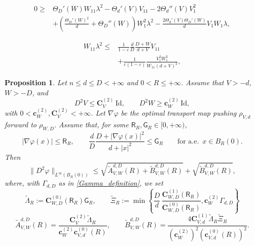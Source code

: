 \documentclass[10pt,a4paper]{amsart}
\newtheorem{proposition}{Proposition}
\newcommand{\CV}{\mathbf{C}_V}
\newcommand{\CVp}[1]{\mathbf{C}_{V,#1}}
\newcommand{\CWp}[1]{\mathbf{C}_{W,#1}}
\newcommand{\ThetaPar}{\Theta}
\newcommand{\cVp}[1]{\mathbf{c}_{V,#1}}
\newcommand{\cW}{\mathbf{c}_W}
\renewcommand{\epsilon}{\varepsilon}
\begin{document}
\begin{equation}\label{Exact_second_variation}
\begin{aligned}
0 \ge{}&
\ThetaPar_D'(W)W_{11}\lambda^2-\ThetaPar_d'(V)V_{11}
-2\ThetaPar_d''(V)V_1^2 \\
&+\left(\frac{\ThetaPar_D'(W)^2}{d}+\ThetaPar_D''(W)\right)W_1^2\lambda^2
-\frac{2\ThetaPar_d'(V)\ThetaPar_D'(W)}{d}V_1W_1\lambda,
\end{aligned}
\end{equation}

\begin{equation}\label{Master_second_variation}
    \begin{aligned}
    W_{11}\lambda^2
    \le{}&
    \frac{1}{1-\epsilon}\frac{d}{D}\frac{D+W}{d+V}V_{11} \\
    &+
    \frac{1}{\epsilon(1-\epsilon)}
    \frac{V_1^2W_1^2}{W_{11}(d+V)^2},
    \end{aligned}
\end{equation}

\begin{proposition}\label{Conditional_finite_D}
Let $n\le d\le D<+\infty$ and $0<R\le+\infty$. Assume that $V>-d$, $W>-D$, and
\[
    D^2V\le \CV^{(2)}\,\mathrm{Id}, \qquad
    D^2W\ge \cW^{(2)}\,\mathrm{Id},
\]
with $0<\cW^{(2)},\CV^{(2)}<+\infty$. Let $\nabla\varphi$ be the optimal transport map pushing $\rho_{V,d}$ forward to $\rho_{W,D}$. Assume that, for some $\mathsf R_R,\mathsf G_R\in[0,+\infty)$,
\begin{equation}\label{Growth_assumption_general}
    |\nabla\varphi(x)|\le \mathsf R_R,
    \qquad
    \frac{d}{D}\frac{D+|\nabla\varphi(x)|^2}{d+|x|^2}\le \mathsf G_R
    \qquad \text{for a.e. }\, x\in B_R(0).
\end{equation}
Then
\begin{equation}\label{Finite_D_local_bound}
    \|D^2\varphi\|_{L^\infty(B_R(0))}
    \le
    \sqrt{\widetilde A_{V,W}^{d,D}(R)+\widetilde B_{V,W}^{d,D}(R)}+\sqrt{\widetilde B_{V,W}^{d,D}(R)},
\end{equation}
where, with $\Gamma_{d,D}$ as in \cref{Gamma_definition}, we set
\[
\widetilde\Lambda_R
:=
\CWp{D}^{(0)}(\mathsf R_R)\mathsf G_R,\qquad
\widetilde\Xi_R
:=
\min\left\{
\frac{D}{d}\,
\frac{\CWp{D}^{(1)}(\mathsf R_R)}
{\CWp{D}^{(0)}(\mathsf R_R)},
\cW^{(2)}\Gamma_{d,D}
\right\}
\]
\[
\widetilde A_{V,W}^{d,D}(R)
=
    \frac{\CV^{(2)}\widetilde\Lambda_R}{\cW^{(2)}\cVp{d}^{(0)}(R)},\qquad
\widetilde B_{V,W}^{d,D}(R)
=
    \frac{4\CVp{d}^{(1)}\widetilde\Lambda_R\widetilde\Xi_R}
    {(\cW^{(2)})^2(\cVp{d}^{(0)}(R))^2}.
\]
\end{proposition}
\end{document}
